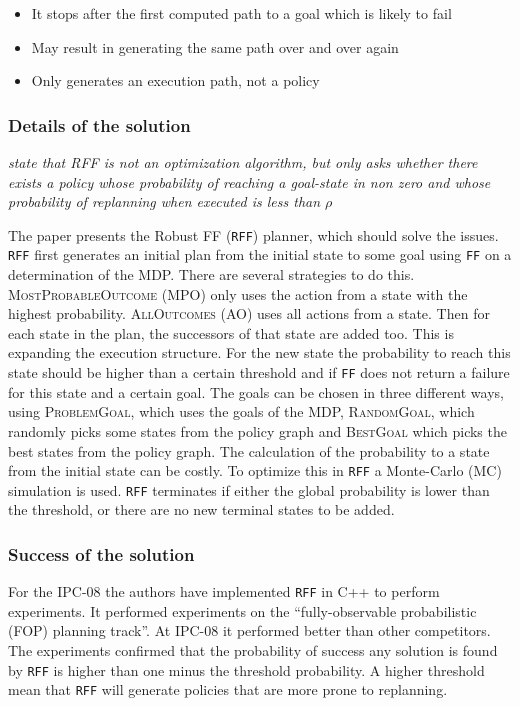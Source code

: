 \documentclass[runningheads,a4paper]{llncs}
\begin{document}
\begin{itemize}
	\item It stops after the first computed path to a goal which is likely to fail
	\item May result in generating the same path over and over again
	\item Only generates an execution path, not a policy
\end{itemize}



\subsubsection{Details of the solution}

\emph{state that RFF is not an optimization algorithm, but only asks whether there exists a policy whose probability of reaching a goal-state in non zero and whose probability of replanning when executed is less than $\rho$}

The paper presents the Robust FF (\texttt{RFF}) planner, which should solve the
issues. \texttt{RFF} first generates an initial plan from the initial state to
some goal using \texttt{FF} on a determination of the MDP\@. There are several
strategies to do this. \textsc{MostProbableOutcome} (MPO) only uses the action
from a state with the highest probability. \textsc{AllOutcomes} (AO) uses all
actions from a state. Then for each state in the plan, the successors of that
state are added too. This is expanding the execution structure. For the new
state the probability to reach this state should be higher than a certain
threshold and if \texttt{FF} does not return a failure for this state and a
certain goal. The goals can be chosen in three different ways, using
\textsc{ProblemGoal}, which uses the goals of the MDP, \textsc{RandomGoal},
which randomly picks some states from the policy graph and \textsc{BestGoal}
which picks the best states from the policy graph. The calculation of the
probability to a state from the initial state can be costly. To optimize this
in \texttt{RFF} a Monte-Carlo (MC) simulation is used. \texttt{RFF} terminates
if either the global probability is lower than the threshold, or there are no
new terminal states to be added.


\subsubsection{Success of the solution}

For the IPC-08 the authors have implemented \texttt{RFF} in C++ to perform
experiments. It performed experiments on the ``fully-observable probabilistic
(FOP) planning track''. At IPC-08 it performed better than other competitors.
The experiments confirmed that the probability of success any solution is found
by \texttt{RFF} is higher than one minus the threshold probability. A higher
threshold mean that \texttt{RFF} will generate policies that are more prone to
replanning.
\end{document}
